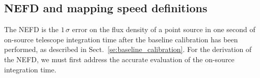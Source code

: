 \subsection{NEFD and mapping speed definitions}
\label{se:integration_time}

The NEFD is the $1\,\sigma$ error on the flux
density of a point source in one second of on-source telescope
integration time after the baseline calibration has been performed, as
described in Sect.~\ref{se:baseline_calibration}.
For the derivation of the NEFD, we must first
address the accurate evaluation of the on-source integration time. 


